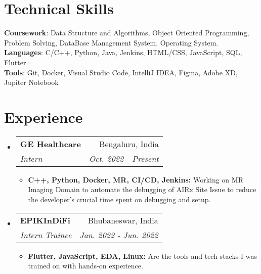\documentclass[letterpaper,11pt]{article}
\makeatletter
\newcommand{\resumeItem}[2]{
  \item\small{
    \textbf{#1}{ #2 \vspace{-2pt}}
  }
}
\newcommand{\resumeSubheading}[4]{
  \vspace{-1pt}\item
    \begin{tabular*}{0.97\textwidth}[t]{l@{\extracolsep{\fill}}r}
      \textbf{#1} & #2 \\
      \textit{\small#3} & \textit{\small #4} \\
    \end{tabular*}\vspace{-5pt}
}
\newcommand{\resumeSubSubheading}[2]{
    \begin{tabular*}{0.97\textwidth}{l@{\extracolsep{\fill}}r}
      \textit{\small#1} & \textit{\small #2} \\
    \end{tabular*}\vspace{-5pt}
}
\newcommand{\resumeSubHeadingListStart}{\begin{itemize}[leftmargin=*]}
\newcommand{\resumeSubHeadingListEnd}{\end{itemize}}
\newcommand{\resumeItemListStart}{\begin{itemize}}
\newcommand{\resumeItemListEnd}{\end{itemize}\vspace{-5pt}}
\makeatother
\begin{document}
\section{Technical Skills}
 \begin{itemize}[leftmargin=0.15in, label={}]
	\small{\item{
		\textbf{Coursework}{: Data Structure and Algorithms, Object Oriented Programming, Problem Solving, DataBase Management System, Operating System.} \\
 	\textbf{Languages}{: C/C++, Python, Java, Jenkins, HTML/CSS, JavaScript, SQL, Flutter.} \\
 		\textbf{Tools}{: Git, Docker, Visual Studio Code, IntelliJ IDEA, Figma, Adobe XD, Jupiter Notebook}\\
	}}
 \end{itemize}
 \vspace{-16pt}
 

\section{Experience}
  \resumeSubHeadingListStart
  
    \resumeSubheading
      {GE Healthcare}{Bengaluru, India}
      {Intern}{Oct. 2022 - Present}
      \resumeItemListStart
        \resumeItem{C++, Python, Docker, MR, CI/CD, Jenkins: }
          {Working on MR Imaging Domain to automate the debugging of AIRx Site Issue to reduce the developer's crucial time spent on debugging and setup.}
      \resumeItemListEnd

    \resumeSubheading
      {EPIKInDiFi}{Bhubaneswar, India}
      {Intern Trainee}{Jan. 2022 - Jun. 2022}
      \resumeItemListStart
        \resumeItem{Flutter, JavaScript, EDA, Linux: }
          {Are the tools and tech stacks I was trained on with hands-on experience.}
      \resumeItemListEnd
    \resumeSubHeadingListEnd
      
      
\end{document}
